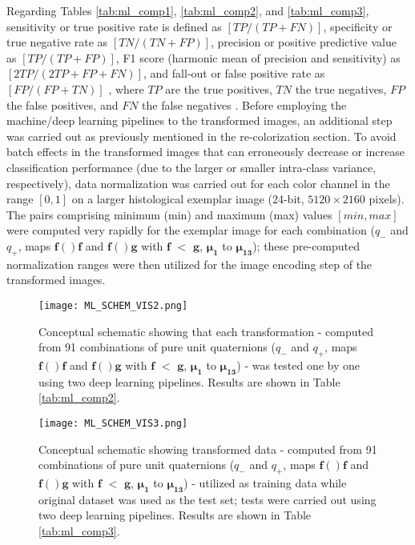 \documentclass[superscriptaddress,longbibliography,aps,prl,twocolumn,10pt]{revtex4-2}
\begin{document}
Regarding Tables \ref{tab:ml_comp1}, \ref{tab:ml_comp2}, and \ref{tab:ml_comp3}, sensitivity or true positive rate is defined as $[TP/(TP+FN)]$, specificity or true negative rate as $[TN/(TN+FP)]$, precision or positive predictive value as $[TP/(TP+FP)]$, F1 score (harmonic mean of precision and sensitivity) as $[2TP/(2TP+FP+FN)]$, and fall-out or false positive rate as $[FP/(FP+TN)]$ \cite{Ting2017}, where $TP$ are the true positives, $TN$ the true negatives, $FP$ the false positives, and $FN$ the false negatives \cite{Tharwat2020}. Before employing the machine/deep learning pipelines to the transformed images, an additional step was carried out as previously mentioned in the re-colorization section. To avoid batch effects in the transformed images that can erroneously decrease or increase classification performance (due to the larger or smaller intra-class variance, respectively), data normalization was carried out for each color channel in the range $[0,1]$ on a larger histological exemplar image (24-bit, $5120 \times 2160$ pixels). The pairs comprising minimum (min) and maximum (max) values $[min,max]$ were computed very rapidly for the exemplar image for each combination ($q_-$ and $q_+$, maps $\boldsymbol{f}()\boldsymbol{f}$ and $\boldsymbol{f}()\boldsymbol{g}$ with $\boldsymbol{f}$ $<$ $\boldsymbol{g}$, $\boldsymbol{\mu_{1}}$ to $\boldsymbol{\mu_{13}}$); these pre-computed normalization ranges were then utilized for the image encoding step of the transformed images.

\begin{figure}[t]
\centering
\texttt{[image: ML\_SCHEM\_VIS2.png]}
\vspace{-12pt}
\caption{\footnotesize{Conceptual schematic showing that each transformation - computed from 91 combinations of pure unit quaternions ($q_-$ and $q_+$, maps $\boldsymbol{f}()\boldsymbol{f}$ and $\boldsymbol{f}()\boldsymbol{g}$ with $\boldsymbol{f}$ $<$ $\boldsymbol{g}$, $\boldsymbol{\mu_{1}}$ to $\boldsymbol{\mu_{13}}$) - was tested one by one using two deep learning pipelines. Results are shown in Table \ref{tab:ml_comp2}.}}
\label{fig:ml2}
\end{figure}

\begin{figure}[t]
\centering
\texttt{[image: ML\_SCHEM\_VIS3.png]}
\vspace{-12pt}
\caption{\footnotesize{Conceptual schematic showing transformed data - computed from 91 combinations of pure unit quaternions ($q_-$ and $q_+$, maps $\boldsymbol{f}()\boldsymbol{f}$ and $\boldsymbol{f}()\boldsymbol{g}$ with $\boldsymbol{f}$ $<$ $\boldsymbol{g}$, $\boldsymbol{\mu_{1}}$ to $\boldsymbol{\mu_{13}}$) - utilized as training data while original dataset was used as the test set; tests were carried out using two deep learning pipelines. Results are shown in Table \ref{tab:ml_comp3}.}}
\label{fig:ml3}
\end{figure}
\end{document}
